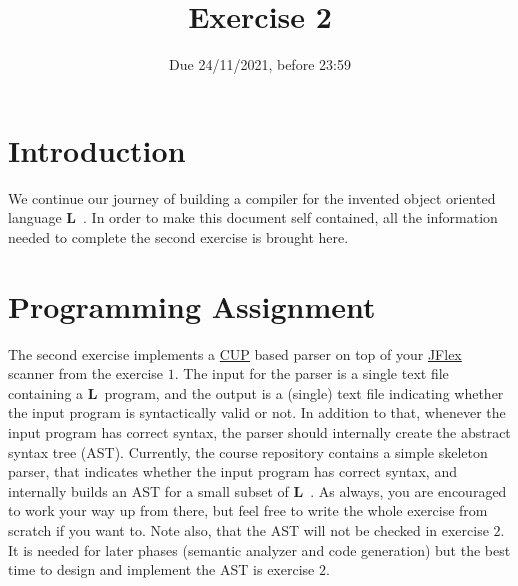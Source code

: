 \documentclass{article}
\begin{document}
\title{Exercise 2}


\date{Due 24/11/2021, before 23:59}

\maketitle

\newcommand{\plname}{\textbf{L}\ }

\section{Introduction}
We continue our journey of building a compiler
for the invented object oriented language \plname.
In order to make this document self contained,
all the information needed to complete the second exercise is brought here.
\section{Programming Assignment}
The second exercise implements a \href{http://www2.cs.tum.edu/projects/cup/}{CUP} based
parser on top of your \href{http://jflex.de/}{JFlex} scanner from the exercise $1$.
The input for the parser is a single text file containing a \plname program,
and the output is a (single) text file indicating whether the input program
is syntactically valid or not. In addition to that,
whenever the input program has correct syntax,
the parser should internally create the abstract syntax tree (AST).
Currently, the course repository contains a simple skeleton
parser, that indicates whether the input program has correct syntax,
and internally builds an AST for a small subset of \plname.
As always, you are encouraged to work your way up from there,
but feel free to write the whole exercise from scratch if you want to.
Note also, that the AST will not be checked in exercise $2$.
It is needed for later phases (semantic analyzer and code generation)
but the best time to design and implement the AST is exercise $2$.
\end{document}
